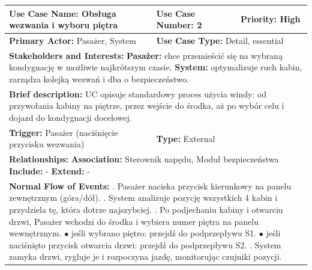 \documentclass[12pt,a4paper]{article}
\begin{document}
\begin{table}[h!]
\centering
\begin{tabular}{|p{}|p{}|p{}|}
\hline
\textbf{Use Case Name:} Obsługa wezwania i wyboru piętra & \textbf{Use Case Number:} 2 & \textbf{Priority:} High \\ \hline
\textbf{Primary Actor:} Pasażer, System & \multicolumn{2}{l|}{\textbf{Use Case Type:} Detail, essential} \\ \hline
\multicolumn{3}{|p{0.9\textwidth}|}{\textbf{Stakeholders and Interests:} \newline
\textbf{Pasażer:} chce przemieścić się na wybraną kondygnację w możliwie najkrótszym czasie. \newline
\textbf{System:} optymalizuje ruch kabin, zarządza kolejką wezwań i dba o bezpieczeństwo.} \\ \hline
\multicolumn{3}{|p{0.9\textwidth}|}{\textbf{Brief description:} UC opisuje standardowy proces użycia windy: od przywołania kabiny na piętrze, przez wejście do środka, aż po wybór celu i dojazd do kondygnacji docelowej.} \\ \hline
\textbf{Trigger:} Pasażer (naciśnięcie przycisku wezwania) & \multicolumn{2}{l|}{\textbf{Type:} External} \\ \hline
\multicolumn{3}{|p{0.9\textwidth}|}{\textbf{Relationships:} \newline
\textbf{Association:} Sterownik napędu, Moduł bezpieczeństwa \newline
\textbf{Include:} - \newline
\textbf{Extend:} -} \\ \hline
\multicolumn{3}{|p{0.9\textwidth}|}{\textbf{Normal Flow of Events:} \newline
1. Pasażer naciska przycisk kierunkowy na panelu zewnętrznym (góra/dół). \newline
2. System analizuje pozycję wszystkich 4 kabin i przydziela tę, która dotrze najszybciej. \newline
3. Po podjechaniu kabiny i otwarciu drzwi, Pasażer wchodzi do środka i wybiera numer piętra na panelu wewnętrznym. \newline
\hspace*{10pt} $\bullet$ jeśli wybrano piętro: przejdź do podprzepływu S1. \newline
\hspace*{10pt} $\bullet$ jeśli naciśnięto przycisk otwarcia drzwi: przejdź do podprzepływu S2. \newline
4. System zamyka drzwi, rygluje je i rozpoczyna jazdę, monitorując czujniki pozycji. \newline
}
\end{tabular}
\end{table}
\end{document}
